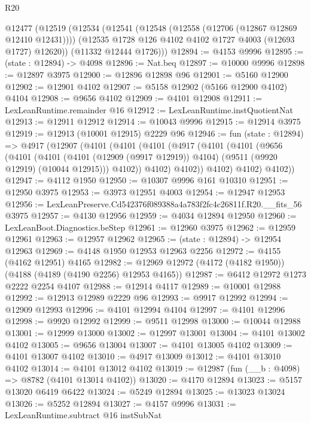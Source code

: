 \begin{lexlean}{R20}
\begin{coremodule}
  @12477
    (@12519
      (@12534
        (@12541
          (@12548 (@12558 (@12706 (@12867 @12869 @12410 @12431))))
          (@12535 @1728 @126 @4102 @4102 @1727 @4003 (@12693 @1727) @12620))
        (@11332 @12444 @1726)))
@12894 := @4153 @9996
@12895 := (state : @12894) -> @4098
@12896 := Nat.beq
@12897 := @10000 @9996
@12898 := @12897 @3975
@12900 := @12896 @12898 @96
@12901 := @5160 @12900
@12902 := @12901 @4102
@12907 := @5158 @12902 (@5166 @12900 @4102) @4104
@12908 := @9656 @4102
@12909 := @4101 @12908
@12911 := LexLeanRuntime.remainder @16
@12912 := LexLeanRuntime.instQuotientNat
@12913 := @12911 @12912
@12914 := @10043 @9996
@12915 := @12914 @3975
@12919 := @12913 (@10001 @12915) @2229 @96
@12946 := fun (state : @12894) =>
  @4917
    (@12907
      (@4101
        (@4101
          (@4101
            (@4917
              (@4101
                (@4101
                  (@9656
                    (@4101
                      (@4101
                        (@4101 (@12909 (@9917 @12919)) @4104)
                        (@9511 (@9920 @12919) (@10044 @12915)))
                      @4102))
                  @4102)
                @4102))
            @4102)
          @4102)
        @4102))
@12947 := @4112 @1950
@12950 := @10307 @9996 @161 @10310
@12951 := @12950 @3975
@12953 := @3973 @12951 @4003
@12954 := @12947 @12953
@12956 := LexLeanPreserve.Cd542376f089388a4a783f2fc4c26811f.R20.__fits_56 @3975
@12957 := @4130 @12956
@12959 := @4034 @12894 @12950
@12960 := LexLeanBoot.Diagnostics.beStep
@12961 := @12960 @3975
@12962 := @12959 @12961
@12963 := @12957 @12962
@12965 := (state : @12894) -> @12954 @12963
@12969 := @4148 @1950 @12953 @12963 @2256
@12972 := @4155 (@4162 @12951) @4165
@12982 := @12969 @12972 (@4172 (@4182 @1950)) (@4188 (@4189 (@4190 @2256) @12953 @4165))
@12987 := @6412 @12972 @1273 @2222 @2254 @4107
@12988 := @12914 @4117
@12989 := @10001 @12988
@12992 := @12913 @12989 @2229 @96
@12993 := @9917 @12992
@12994 := @12909 @12993
@12996 := @4101 @12994 @4104
@12997 := @4101 @12996
@12998 := @9920 @12992
@12999 := @9511 @12998
@13000 := @10044 @12988
@13001 := @12999 @13000
@13002 := @12997 @13001
@13004 := @4101 @13002 @4102
@13005 := @9656 @13004
@13007 := @4101 @13005 @4102
@13009 := @4101 @13007 @4102
@13010 := @4917 @13009
@13012 := @4101 @13010 @4102
@13014 := @4101 @13012 @4102
@13019 := @12987 (fun (__b : @4098) => @8782 (@4101 @13014 @4102))
@13020 := @4170 @12894
@13023 := @5157 @13020 @6419 @6422
@13024 := @5249 @12894
@13025 := @13023 @13024
@13026 := @5252 @12894
@13027 := @4157 @9996
@13031 := LexLeanRuntime.subtract @16 instSubNat

\end{coremodule}
\end{lexlean}

